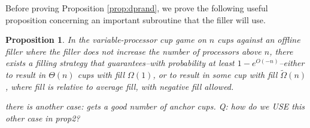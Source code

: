 \documentclass{article}[11pt]
\newtheorem{proposition}{Proposition}
\begin{document}
Before proving Proposition \ref{prop:dprand}, we prove the following useful
proposition concerning an important subroutine that the filler will use.
\begin{proposition}
  \label{prop:tail}
  In the variable-processor cup game on $n$ cups against an offline filler
  where the filler does not increase the number of processors above $n$,
  there exists a filling strategy that guarantees--with probability at least
  $1-e^{O(-n)}$--either to result in $\Theta(n)$ cups with fill
  $\Omega(1)$, or to result in some cup with fill $\tilde{\Omega}(n)$, where
  fill is relative to average fill, with negative fill allowed.

  {\color{red} there is another case: gets a good number of anchor cups. Q: how
  do we USE this other case in prop2?}
\end{proposition}
\end{document}
